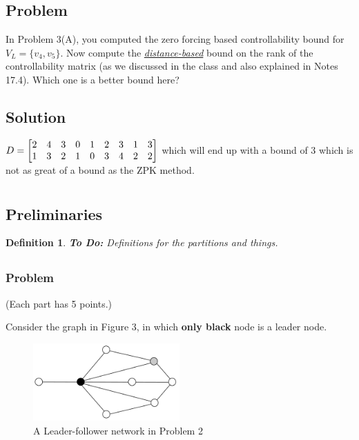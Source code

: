\documentclass[]{article}
\numberwithin{equation}{section}
\newtheorem{definition}{Definition}
\begin{document}
\subsection*{Problem}
In Problem 3(A), you computed the zero forcing based controllability bound for $V_L = \{v_4,v_5\}$. 
Now compute the \emph{\underline{distance-based}} bound on the rank of the controllability matrix (as we discussed in the class and also explained in Notes 17.4). 
Which one is a better bound here?

\subsection*{Solution}

$D = \mqty[
    2 & 4 & 3 & 0 & 1 & 2 & 3 & 1 & 3\\
    1 & 3 & 2 & 1 & 0 & 3 & 4 & 2 & 2
]$
which will end up with a bound of 3 which is not as great of a bound as the ZPK method.

\newpage
\section{}
\subsection*{Preliminaries}
\begin{definition}
    \textbf{To Do:}
    Definitions for the partitions and things.
\end{definition}

\subsection{}
\subsubsection*{Problem}
(Each part has 5 points.)

Consider the graph in Figure 3, in which \textbf{only black} node is a leader node.

\begin{figure}[h]
    \centering
    \includegraphics[width = 0.5\textwidth]{figs/image3.png}
    \caption{A Leader-follower network in Problem 2}
\end{figure}
\end{document}

